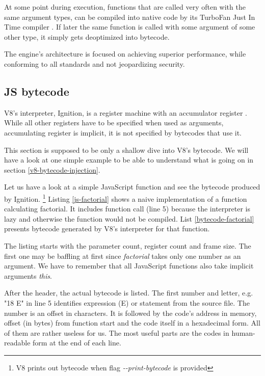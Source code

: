 At some point during execution, functions that are called very often with the same argument types, 
can be compiled into native code by its TurboFan Just In Time compiler \cite{v8:turbofan-jit}.
If later the same function is called with some argument of some other type, it simply gets deoptimized into bytecode.

The engine's architecture is focused on achieving superior performance, while conforming to all
standards and not jeopardizing security. 


\subsection{JS bytecode}
\label{v8-bytecode}
V8's interpreter, Ignition, is a register machine with an accumulator register \cite{medium:js-bytecode}.
While all other registers have to be specified when used as arguments, accumulating register
is implicit, it is not specified by bytecodes that use it.

This section is supposed to be only a shallow dive into V8's bytecode. We will have a look at one simple example
to be able to understand what is going on in section \ref{v8-bytecode-injection}.

Let us have a look at a simple JavaScript function and see the bytecode produced by Ignition.
\footnote{V8 prints out bytecode when flag \emph{-{}-print-bytecode} is provided}
Listing \ref{js-factorial} shows a naive implementation of a function calculating factorial.
It includes function call (line 5) because the interpreter is lazy and otherwise the function would not be compiled.
List \ref{bytecode-factorial} presents bytecode generated by V8's interpreter for that function.




The listing starts with the parameter count, register count and frame size. The first one may be baffling at first
since \emph{factorial} takes only one number as an argument. We have to remember 
that all JavaScript functions also take implicit arguments \emph{this}.

After the header, the actual bytecode is listed. The first number and letter, e.g. "18 E" in line 5 identifies expression (E)
or statement from the source file. The number is an offset in characters.
It is followed by the code's address in memory, offset (in bytes) from function start and the code itself in a hexadecimal form.
All of them are rather useless for us. The most useful parts are the codes in human-readable form at the end of each line.


